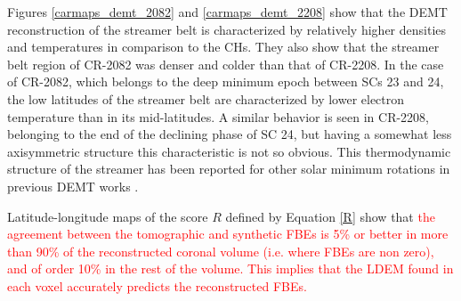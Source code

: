 \documentclass[namedreferences]{solarphysics}
\def\edit#1{\textcolor{Red}{#1}}
\begin{document}
\begin{article}
{{Figures \ref{carmaps_demt_2082} and \ref{carmaps_demt_2208} show that} the DEMT reconstruction of the streamer belt is characterized by relatively higher densities and temperatures in comparison to the CHs. They also show that the streamer belt region of CR-2082 was denser and colder than  that of CR-2208.} In the case of CR-2082, which belongs to the deep minimum epoch between {SCs 23 and 24}, the {low latitudes of the streamer belt are characterized by lower electron temperature than in its mid-latitudes.} A similar behavior is seen in CR-2208, belonging to the {end of the declining} phase of {SC 24}, but having a {somewhat less axisymmetric} structure this characteristic is not so obvious. This thermodynamic structure of the streamer has been reported for other solar minimum rotations in previous DEMT works \citep{lloveras_2017,nuevo_2013,vasquez_2010}.

Latitude-longitude maps of the score $R$ defined by Equation \ref{R} show that \edit{the agreement between the tomographic and synthetic FBEs is 5\% or better in more than 90\% of the reconstructed coronal volume (i.e. where FBEs are non zero), and of order 10\% in the rest of the volume. This implies that the LDEM found in each voxel accurately predicts the reconstructed FBEs.}


\end{article}
\end{document}
